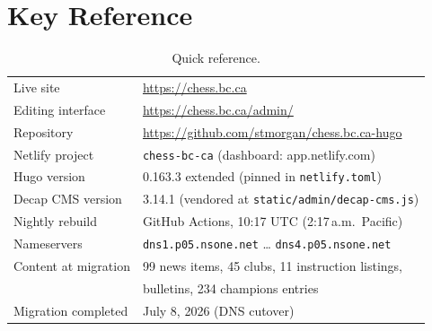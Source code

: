 \documentclass[12pt,letterpaper]{article}
\begin{document}
\section{Key Reference}
\label{sec:ref}

\begin{table}[h]
\centering
\small
\begin{tabular}{@{}ll@{}}
\toprule
Live site & \url{https://chess.bc.ca} \\
Editing interface & \url{https://chess.bc.ca/admin/} \\
Repository & \url{https://github.com/stmorgan/chess.bc.ca-hugo} \\
Netlify project & \texttt{chess-bc-ca} (dashboard: app.netlify.com) \\
Hugo version & 0.163.3 extended (pinned in \texttt{netlify.toml}) \\
Decap CMS version & 3.14.1 (vendored at \texttt{static/admin/decap-cms.js}) \\
Nightly rebuild & GitHub Actions, 10:17 UTC (2:17\,a.m.\ Pacific) \\
Nameservers & \texttt{dns1.p05.nsone.net} \ldots{} \texttt{dns4.p05.nsone.net} \\
Content at migration & 99 news items, 45 clubs, 11 instruction listings, \\
 & \quad 485 bulletins, 234 champions entries \\
Migration completed & July 8, 2026 (DNS cutover) \\
\bottomrule
\end{tabular}
\caption{Quick reference.}
\label{tab:ref}
\end{table}
\end{document}
